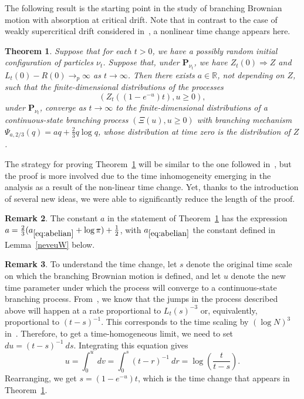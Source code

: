 \documentclass[10pt]{amsart}
\newtheorem{theo}{Theorem}[section]
\theoremstyle{definition}\newtheorem{defi}[theo]{Definition}\newtheorem{rema}[theo]{Remark}\newtheorem{exam}[theo]{Example}\newtheorem{exem}[theo]{Example}\newtheorem{nota}[theo]{Notation}
\renewcommand*\P{\mathbf{P}}
\newcommand*\R{\mathbb{R}}
\newcommand{\1} {\mathds{1}}
\begin{document}
The following result is the starting point in the study of branching Brownian motion with absorption at critical drift. Note that in contrast to the case of weakly supercritical drift considered in~\cite{bbs2}, a nonlinear time change appears here.

\begin{theo}\label{CSBPthm}
Suppose that for each $t > 0$, we have a possibly random initial configuration of particles $\nu_t$. Suppose that, under $\P_{\nu_t}$, we have $Z_t(0) \Rightarrow Z$ and $L_t(0) - R(0) \rightarrow_p \infty$ as $t \rightarrow \infty$. Then there exists $a \in \R$, not depending on $Z$, such that
the finite-dimensional distributions of the processes
\[
\left(Z_t\left(\left(1 - e^{-u}\right) t\right), u \geq 0\right),
\]
under $\P_{\nu_t}$, converge as $t \rightarrow \infty$ to the finite-dimensional distributions of a continuous-state branching process $(\Xi(u), u \geq 0)$ with branching mechanism $\Psi_{a,2/3}(q) = aq + \frac{2}{3} q \log q$, whose distribution at time zero is the distribution of $Z$.
\end{theo}

The strategy for proving Theorem~\ref{CSBPthm} will be similar to the one followed in~\cite{bbs2}, but the proof is more involved due to the time inhomogeneity emerging in the analysis as a result of the non-linear time change. Yet, thanks to the introduction of several new ideas, we were able to significantly reduce the length of the proof.

\begin{rema}
The constant $a$ in the statement of Theorem~\ref{CSBPthm} has the expression $a=\frac{2}{3}(a_{\eqref{eq:abelian}}+\log \pi)+\frac{1}{2}$, with $a_{\eqref{eq:abelian}}$ the constant defined in Lemma~\ref{neveuW} below.
\end{rema}

\begin{rema}
To understand the time change, let $s$ denote the original time scale on which the branching Brownian motion is defined, and let $u$ denote the new time parameter under which the process will converge to a continuous-state branching process. From~\cite{bbs2}, we know that the jumps in the process described above will happen at a rate proportional to $L_t(s)^{-3}$ or, equivalently, proportional to $(t - s)^{-1}$. This corresponds to the time scaling by $(\log N)^3$ in~\cite{bbs2}. Therefore, to get a time-homogeneous limit, we need to set $du = (t - s)^{-1} \: ds.$ Integrating this equation gives
\[
u = \int_0^u \: dv = \int_0^s (t - r)^{-1} \: dr = \log \left(\frac{t}{t-s} \right).
\]
Rearranging, we get $s = (1 - e^{-u}) t$, which is the time change that appears in Theorem~\ref{CSBPthm}.
\end{rema}
\end{document}
